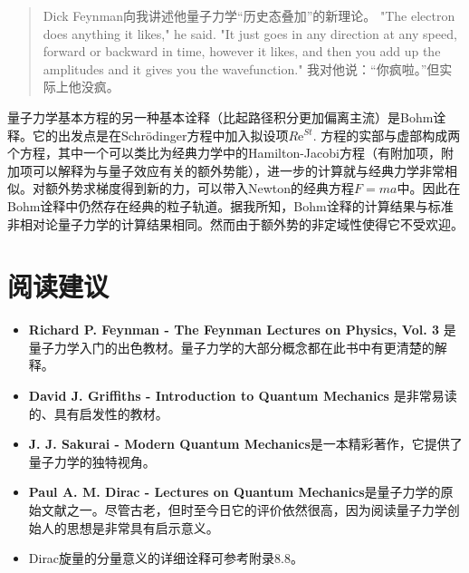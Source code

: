 \begin{quote}
Dick Feynman向我讲述他量子力学“历史态叠加”的新理论。 "The electron does anything it likes," he said. "It just goes in any direction at any speed, forward or backward in time, however it likes, and then you add up the amplitudes and it gives you the wavefunction."
我对他说：“你疯啦。”但实际上他没疯。
\end{quote}

量子力学基本方程的另一种基本诠释（比起路径积分更加偏离主流）是Bohm诠释。它的出发点是在Schrödinger方程中加入拟设项$R \mathrm{e}^{St}$. 方程的实部与虚部构成两个方程，其中一个可以类比为经典力学中的Hamilton-Jacobi方程（有附加项，附加项可以解释为与量子效应有关的额外势能），进一步的计算就与经典力学非常相似。对额外势求梯度得到新的力，可以带入Newton的经典方程$F = ma$中。因此在Bohm诠释中仍然存在经典的粒子轨道。据我所知，Bohm诠释的计算结果与标准非相对论量子力学的计算结果相同。然而由于额外势的非定域性使得它不受欢迎。


\section*{阅读建议}
\begin{itemize}
\item {\bf Richard P. Feynman - The Feynman Lectures on Physics, Vol. 3} 是量子力学入门的出色教材。量子力学的大部分概念都在此书中有更清楚的解释。
\item {\bf  David J. Griffiths - Introduction to Quantum Mechanics}
是非常易读的、具有启发性的教材。
\item {\bf  J. J. Sakurai - Modern Quantum Mechanics}是一本精彩著作，它提供了量子力学的独特视角。
\item {\bf Paul A. M. Dirac - Lectures on Quantum Mechanics}是量子力学的原始文献之一。尽管古老，但时至今日它的评价依然很高，因为阅读量子力学创始人的思想是非常具有启示意义。
\item Dirac旋量的分量意义的详细诠释可参考附录8.8。
\end{itemize}


